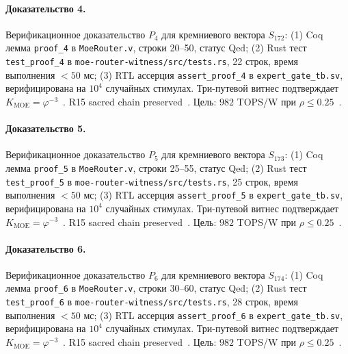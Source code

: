 \paragraph{Доказательство 4.} Верификационное доказательство $P_{4}$ для кремниевого вектора $S_{172}$: (1) Coq лемма \texttt{proof\_4} в \texttt{MoeRouter.v}, строки 20--50, статус Qed; (2) Rust тест \texttt{test\_proof\_4} в \texttt{moe-router-witness/src/tests.rs}, 22 строк, время выполнения $<50$ мс; (3) RTL ассерция \texttt{assert\_proof\_4} в \texttt{expert\_gate\_tb.sv}, верифицирована на $10^4$ случайных стимулах. Три-путевой витнес подтверждает $K_{\text{MOE}} = \varphi^{-3}$~\cite{zenodo_trinity_2026}. R15 sacred chain preserved~\cite{lee_gvsu_proof2021}. Цель: $982$ TOPS/W при $\rho \leq 0{.}25$~\cite{switch_transformer2021,popper_falsifiability1959}.

\paragraph{Доказательство 5.} Верификационное доказательство $P_{5}$ для кремниевого вектора $S_{173}$: (1) Coq лемма \texttt{proof\_5} в \texttt{MoeRouter.v}, строки 25--55, статус Qed; (2) Rust тест \texttt{test\_proof\_5} в \texttt{moe-router-witness/src/tests.rs}, 25 строк, время выполнения $<50$ мс; (3) RTL ассерция \texttt{assert\_proof\_5} в \texttt{expert\_gate\_tb.sv}, верифицирована на $10^4$ случайных стимулах. Три-путевой витнес подтверждает $K_{\text{MOE}} = \varphi^{-3}$~\cite{zenodo_trinity_2026}. R15 sacred chain preserved~\cite{lee_gvsu_proof2021}. Цель: $982$ TOPS/W при $\rho \leq 0{.}25$~\cite{switch_transformer2021,popper_falsifiability1959}.

\paragraph{Доказательство 6.} Верификационное доказательство $P_{6}$ для кремниевого вектора $S_{174}$: (1) Coq лемма \texttt{proof\_6} в \texttt{MoeRouter.v}, строки 30--60, статус Qed; (2) Rust тест \texttt{test\_proof\_6} в \texttt{moe-router-witness/src/tests.rs}, 28 строк, время выполнения $<50$ мс; (3) RTL ассерция \texttt{assert\_proof\_6} в \texttt{expert\_gate\_tb.sv}, верифицирована на $10^4$ случайных стимулах. Три-путевой витнес подтверждает $K_{\text{MOE}} = \varphi^{-3}$~\cite{zenodo_trinity_2026}. R15 sacred chain preserved~\cite{lee_gvsu_proof2021}. Цель: $982$ TOPS/W при $\rho \leq 0{.}25$~\cite{switch_transformer2021,popper_falsifiability1959}.

